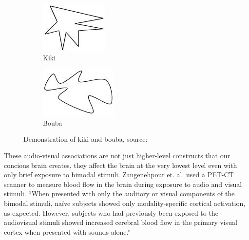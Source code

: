 \begin{figure}[ht]
\centering
\begin{subfigure}{.5\textwidth}
  \centering
  \includegraphics[width=0.7\linewidth]{figs/kiki.png}
  \caption{Kiki}
  \label{fig:kiki}
\end{subfigure}%
\begin{subfigure}{.5\textwidth}
  \centering
  \includegraphics[width=0.7\linewidth]{figs/bouba.png}
  \caption{Bouba}
  \label{fig:bouba}
\end{subfigure}
  \caption{Demonstration of kiki and bouba, source: \cite{Ramachandran2001}}
  \label{fig:boubakiki}
\end{figure}

These audio-visual associations are not just higher-level constructs that our
concious brain creates, they affect the brain at the very lowest level even
with only brief exposure to bimodal stimuli. Zangenehpour et. al.
\cite{Zangenehpour2010} used a PET-CT scanner to measure blood flow in the
brain during exposure to audio and visual stimuli. ``When presented with only
the auditory or visual components of the bimodal stimuli, na\"{i}ve subjects
showed only modality-specific cortical activation, as expected.  However,
subjects who had previously been exposed to the audiovisual stimuli showed
increased cerebral blood flow in the primary visual cortex when presented with
sounds alone.''

